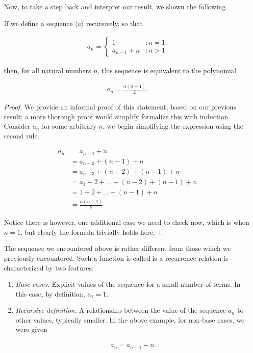 \documentclass[twoside]{report}
\begin{document}
Now, to take a step back and interpret our result, we shown the following.

\vspace{\baselineskip}
\begin{theorem}
	If we define a sequence $\langle a \rangle$ recursively, so that
	
	\begin{align*}
		a_n =
		\begin{cases}
			1 &: n = 1 \\
			a_{n - 1} + n &: n > 1
		\end{cases}
	\end{align*}
	
	then, for all natural numbers $n$, this sequence is equivalent to the polynomial
	
	\begin{align}
		a_n = \frac{n(n + 1)}{2}.
	\end{align}
\end{theorem}
\begin{proof}
	We provide an informal proof of this statement, based on our previous result; a more thorough proof would simplify formalize this with induction. Consider $a_n$ for some arbitrary $n$, we begin simplifying the expression using the second rule.
	
	\begin{align*}
		a_n &= a_{n - 1} + n \\
		&= a_{n - 2} + (n - 1) + n \\
		&= a_{n - 3} + (n - 2) + (n - 1) + n \\
		&= a_1 + 2 + \dots + (n - 2) + (n - 1) + n \\
		&= 1 + 2 + \dots + (n - 1) + n \\
		&= \frac{n (n + 1)}{2}
	\end{align*}
	
	Notice there is however, one additional case we need to check now, which is when $n = 1$, but clearly the formula trivially holds here.
\end{proof}
\vspace{\baselineskip}

The sequence we encountered above is rather different from those which we previously encountered. Such a function is called is a recurrence relation is characterized by two features:

\begin{enumerate}
	\item \emph{Base cases.} Explicit values of the sequence for a small number of terms. In this case, by definition, $a_1 = 1$.
	\item \emph{Recursive definition.} A relationship between the value of the sequence $a_n$ to other values, typically smaller. In the above example, for non-base cases, we were given
	
	\begin{align*}
		a_n = a_{n - 1} + n.
	\end{align*}
\end{enumerate}
\end{document}
